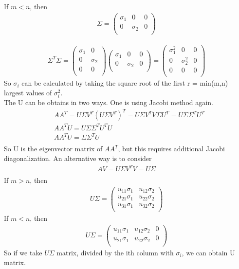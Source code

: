 \documentclass[a4paper]{article}
\begin{document}
If $m < n $, then\\
\begin{align*}
	\Sigma = \left(  \begin{array} {ccc }
		\sigma_1 & 0 & 0\\
		0 & \sigma_2 & 0\\
	\end{array} \right)
\end{align*}

\begin{align*}
	\Sigma^T \Sigma = \left(  \begin{array} {cc}
		\sigma_1 & 0  \\
		0 & \sigma_2 \\
		0 & 0\\
	\end{array} \right)
	\left(  \begin{array} {ccc}
		\sigma_1 & 0 & 0\\
		0 & \sigma_2 & 0\\
	\end{array} \right)
	= \left(  \begin{array} {ccc}
		\sigma_1^2 & 0 & 0\\
		0 & \sigma_2^2 & 0\\
		0 & 0 & 0\\
	\end{array} \right)
\end{align*}
So $\sigma_i$ can be calculated by taking the square root of the first r = min(m,n) largest values of $\sigma_i^2$.\\
The U can be obtains in two ways. One is using Jacobi method again.
\begin{align*}
	& A A^T =  U \Sigma V^T (U \Sigma V^T)^T = U \Sigma V^T V \Sigma U^T = U \Sigma \Sigma^T U^T \\
	& A A^T U =  U \Sigma \Sigma^T U^T U \\
	& A A^T U =  \Sigma \Sigma^T U \\
\end{align*}
So U is the eigenvector matrix of $A A^T$, but this requires additional Jacobi diagonalization. An alternative way is to consider\\
\begin{align*}
	AV = U \Sigma V^T V = U \Sigma\\
\end{align*}
If $m > n $, then\\
\begin{align*}
	U\Sigma = \left(  \begin{array} {cc}
		u_{11}\sigma_1 & u_{12}\sigma_2 \\
		u_{21}\sigma_1 & u_{22}\sigma_2 \\
		u_{31}\sigma_1 & u_{32}\sigma_2 \\
	\end{array} \right)
\end{align*}	
If $m < n $, then\\
\begin{align*}
	U\Sigma = \left(  \begin{array} {ccc}
		u_{11}\sigma_1 & u_{12}\sigma_2 & 0\\
		u_{21}\sigma_1 & u_{22}\sigma_2 & 0\\
	\end{array} \right)
\end{align*}
So if we take $U\Sigma$ matrix, divided by the ith column with $\sigma_i$, we can obtain U matrix.\\
\end{document}

